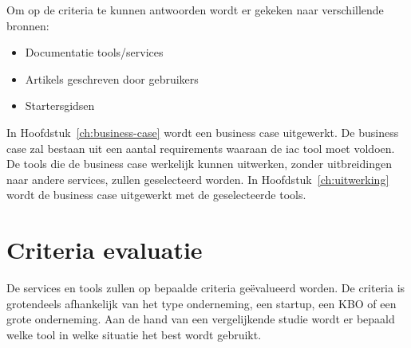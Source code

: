 Om op de criteria te kunnen antwoorden wordt er gekeken naar verschillende bronnen:

\begin{itemize}
    \item Documentatie tools/services
    \item Artikels geschreven door gebruikers
    \item Startersgidsen
\end{itemize}

In Hoofdstuk~\ref{ch:business-case} wordt een business case uitgewerkt.
De business case zal bestaan uit een aantal requirements waaraan de \acrshort{iac} tool moet voldoen.
De tools die de business case werkelijk kunnen uitwerken, zonder uitbreidingen naar andere services, zullen geselecteerd worden.
In Hoofdstuk~\ref{ch:uitwerking} wordt de business case uitgewerkt met de geselecteerde tools.


\section{Criteria evaluatie}
\label{sec:criteria-evaluatie}

De services en tools zullen op bepaalde criteria geëvalueerd worden.
De criteria is grotendeels afhankelijk van het type onderneming, een startup, een KBO of een grote onderneming.
Aan de hand van een vergelijkende studie wordt er bepaald welke tool in welke situatie het best wordt gebruikt.

